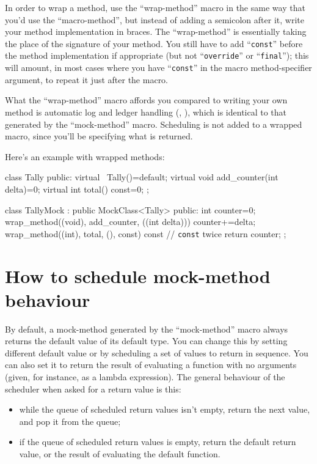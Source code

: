 \documentclass[twoside, a4paper, article]{memoir}
\begin{document}
In order to wrap a method, use the ``wrap-method'' macro in the same way that
you'd use the ``macro-method'', but instead of adding a semicolon after it,
write your method implementation in braces.  The ``wrap-method'' is essentially
taking the place of the signature of your method.  You still have to add
``\texttt{const}'' before the method implementation if appropriate (but not
``\texttt{override}'' or ``\texttt{final}''); this will amount, in most cases
where you have ``\texttt{const}'' in the macro method-specifier argument, to
repeat it just after the macro.

What the ``wrap-method'' macro affords you compared to writing your own method
is automatic log and ledger handling (,
), which is identical to that generated by
the ``mock-method'' macro.  Scheduling is not added to a wrapped macro, since
you'll be specifying what is returned.

Here's an example with wrapped methods:
\begin{cpplisting}
class Tally {
public:
  virtual ~Tally()=default;
  virtual void add_counter(int delta)=0;
  virtual int total() const=0;
};

class TallyMock
  : public MockClass<Tally> {
public:
  int counter=0;
  wrap_method((void), add_counter, ((int delta))) {
    counter+=delta;
  }
  wrap_method((int), total, (), const) const { // \texttt{const} twice
    return counter;
  }
};
\end{cpplisting}


\section{How to schedule mock-method behaviour}
\label{sec:schedule-mock-method}

By default, a mock-method generated by the ``mock-method'' macro always returns
the default value of its default type.  You can change this by setting
different default value or by scheduling a set of values to return in sequence.
You can also set it to return the result of evaluating a function with no
arguments (given, for instance, as a lambda expression).  The general behaviour
of the scheduler when asked for a return value is this:
\begin{itemize}
\item while the queue of scheduled return values isn't empty, return the next
  value, and pop it from the queue;
\item if the queue of scheduled return values is empty, return the default
  return value, or the result of evaluating the default function.
\end{itemize}
\end{document}
